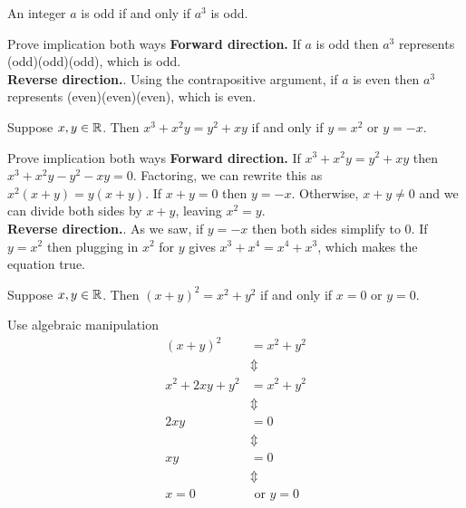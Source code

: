 \documentclass{article}
\begin{document}
\begin{problem}
An integer $a$ is odd if and only if $a^3$ is odd.
\end{problem}

\begin{solution}{Prove implication both ways}
  \textbf{Forward direction.} If $a$ is odd then $a^3$ represents (odd)(odd)(odd), which is odd.
  \\
  \textbf{Reverse direction.}. Using the contrapositive argument, if $a$ is even then $a^3$ represents (even)(even)(even), which is even.
\end{solution}

\begin{problem}
Suppose $x, y \in \mathbb{R}$. Then $x^3 + x^2 y = y^2 + xy$ if and only if $y = x^2$ or $y = -x$.
\end{problem}
\begin{solution}{Prove implication both ways}
  \textbf{Forward direction.} If $x^3 + x^2 y = y^2 + xy$ then $x^3 + x^2 y - y^2 - xy = 0$. Factoring, we can rewrite this as $x^2(x + y) = y(x + y)$. If $x + y = 0$ then $y = -x$. Otherwise, $x + y \neq 0$ and we can divide both sides by $x + y$, leaving $x^2 = y$.
  \\
  \textbf{Reverse direction.}. As we saw, if $y = -x$ then both sides simplify to 0. If $y = x^2$ then plugging in $x^2$ for $y$ gives $x^3 + x^4 = x^4 + x^3$, which makes the equation true.
\end{solution}

\begin{problem}
Suppose $x, y \in \mathbb{R}$. Then $(x+y)^2 = x^2 + y^2$ if and only if $x = 0$ or $y = 0$.
\end{problem}
\begin{solution}{Use algebraic manipulation}
  \begin{align*}
    (x+y)^2         & = x^2 + y^2       \\
                    & \Updownarrow      \\
    x^2 + 2xy + y^2 & = x^2 + y^2       \\
                    & \Updownarrow      \\
    2xy             & = 0               \\
                    & \Updownarrow      \\
    xy              & = 0               \\
                    & \Updownarrow      \\
    x = 0           & \text{ or } y = 0
  \end{align*}
\end{solution}
\end{document}
